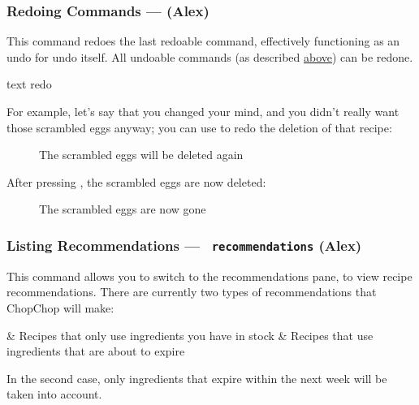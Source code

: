 
\pagebreak
\hypertarget{RedoCommand}{}
\subsubsection{Redoing Commands — \texttt{} (Alex)}
	This command redoes the last redoable command, effectively functioning as an undo for undo itself. All undoable commands
	(as described \hyperlink{UndoCommand}{above}) can be redone.

	 \begin{blockofcode}{text}
		redo
	\end{blockofcode}

	For example, let's say that you changed your mind, and you didn't really want those scrambled eggs anyway; you can use 
	to redo the deletion of that recipe:

	\begin{figure}[!htbp]\centering\ContinuedFloat*
		\caption{The scrambled eggs will be deleted again}
	\end{figure}

	\pagebreak
	After pressing , the scrambled eggs are now deleted:

	\begin{figure}[!htbp]\centering\ContinuedFloat
		\caption{The scrambled eggs are now gone}
	\end{figure}





\hypertarget{ListRecommendationCommand}{}
\subsubsection{Listing Recommendations — \texttt{ recommendations} (Alex)}

	This command allows you to switch to the recommendations pane, to view recipe recommendations. There are currently two types
	of recommendations that ChopChop will make:

	\begin{romanlist}
		& Recipes that only use ingredients you have in stock
		& Recipes that use ingredients that are about to expire
	\end{romanlist}

	In the second case, only ingredients that expire within the next week will be taken into account.

